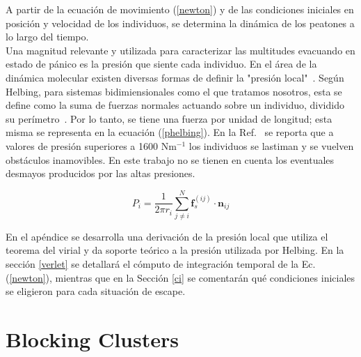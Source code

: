A partir de la ecuación de movimiento (\ref{newton}) y de las condiciones iniciales en posición y velocidad de los individuos, se determina la dinámica de los peatones a lo largo del tiempo.\\

Una magnitud relevante y utilizada para caracterizar las multitudes evacuando en estado de pánico es la presión que siente cada individuo. En el área de la dinámica molecular existen diversas formas de definir la "presión local"~\cite{lion}. Según Helbing, para sistemas bidimiensionales como el que tratamos nosotros, esta se define como la suma de fuerzas normales actuando sobre un individuo, dividido su perímetro~\cite{Helbing1}. Por lo tanto, se tiene una fuerza por unidad de longitud; esta misma se representa en la ecuación (\ref{phelbing}).
En la Ref.~\cite{Helbing1} se reporta que a valores de presión superiores a 1600 Nm$^{-1}$ los individuos se lastiman y se vuelven obstáculos inamovibles. En este trabajo no se tienen en cuenta los eventuales desmayos producidos por las altas presiones. 

\begin{equation}
P_i =\frac{1}{2\pi r_{i}} \sum_{j\neq i}^{N}\mathbf{f}_s^{(ij)} \cdot\mathbf{n}_{ij}
\label{phelbing}
\end{equation} 

En el apéndice se desarrolla una derivación de la presión local que utiliza el teorema del virial y da soporte teórico a la presión utilizada por Helbing.
En la sección \ref{verlet} se detallará el cómputo de integración temporal de la Ec. (\ref{newton}), mientras que en la Sección \ref{ci} se comentarán qué condiciones iniciales se eligieron para cada situación de escape. 


\section{Blocking Clusters}

